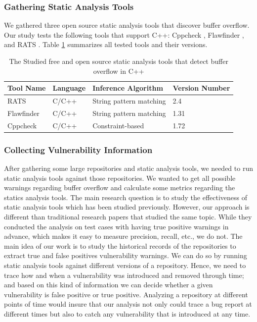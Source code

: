 \subsubsection{\textbf{Gathering Static Analysis Tools}}
We gathered three open source static analysis tools that discover buffer overflow. Our study tests the following tools that support C++:  Cppcheck \cite{Torri2010}, Flawfinder \cite{Torri2010}, and RATS \cite{Torri2010}.  Table \ref{C++SAT} summarizes all tested tools and their versions. 


\begin{table}[ht]
\centering
\scriptsize
\caption{The Studied free and open source static analysis tools that detect buffer overflow in C++}
\label{C++SAT}
\begin{tabular}{||p{1.5cm}|p{1cm} p{2.6cm}p{1.2cm}||}
\hline
 \textbf{Tool Name} &  \textbf{Language} &\textbf{Inference Algorithm} &  \textbf{Version Number}\\

\hline\hline

RATS & C/C++ &String pattern matching &  2.4\\  
Flawfinder & C/C++ &String pattern matching &  1.31 \\  
Cppcheck  &C/C++ & Constraint-based & 1.72 \\ \hline

\end{tabular}
\end{table}


\subsubsection{\textbf{Collecting Vulnerability Information}}
After gathering some large repositories and static analysis tools, we needed to run static analysis tools against those repositories. We wanted to get all possible warnings regarding buffer overflow and calculate some metrics regarding the statics analysis tools. The main research question is to study the effectiveness of static analysis tools which has been studied previously. However, our approach is different than traditional research papers that studied the same topic. While they conducted the analysis on test cases with having true positive warnings in advance, which makes it easy to measure precision, recall, etc., we do not.
The main idea of our work is to study the historical records of the repositories to extract true and false positives vulnerability warnings. We can do so by running static analysis tools against different versions of a repository. Hence, we need to trace how and when a vulnerability was introduced and removed through time; and based on this kind of information we can decide whether a given vulnerability is false positive or true positive. Analyzing a repository at different points of time would insure that our analysis not only could trace a bug report at different times but also to catch any vulnerability that is introduced at any time.

